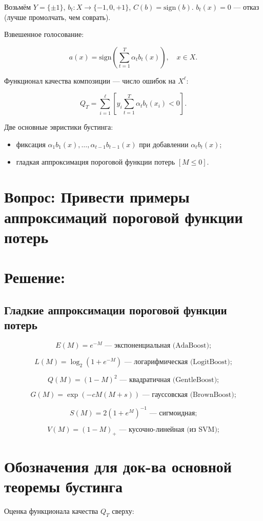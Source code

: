 Возьмём \( Y = \{\pm1\} \), \( b_t: X \rightarrow \{-1, 0, +1\} \), \( C(b) = \text{sign}(b) \).
\( b_t(x) = 0 \) — отказ (лучше промолчать, чем соврать).

Взвешенное голосование:

\[
    a(x) = \text{sign}\left(\sum_{t=1}^T \alpha_t b_t(x)\right), \quad x \in X.
\]

Функционал качества композиции — число ошибок на \( X^\ell \):

\[
    Q_T = \sum_{i=1}^\ell \left[ y_i \sum_{t=1}^T \alpha_t b_t(x_i) < 0 \right].
\]

Две основные эвристики бустинга:
\begin{itemize}
    \item фиксация \(\alpha_1 b_1(x), \ldots, \alpha_{t-1} b_{t-1}(x)\) при добавлении \(\alpha_t b_t(x)\);
    \item гладкая аппроксимация пороговой функции потерь \([M \leq 0]\).
\end{itemize}
\section*{Вопрос: Привести примеры аппроксимаций пороговой функции потерь}
\section*{Решение:}
\subsection*{Гладкие аппроксимации пороговой функции потерь}
\[
    E(M) = e^{-M} \text{ — экспоненциальная (AdaBoost);}
\]

\[
    L(M) = \log_2(1 + e^{-M}) \text{ — логарифмическая (LogitBoost);}
\]

\[
    Q(M) = (1 - M)^2 \text{ — квадратичная (GentleBoost);}
\]

\[
    G(M) = \exp\left(-cM(M + s)\right) \text{ — гауссовская (BrownBoost);}
\]

\[
    S(M) = 2(1 + e^{M})^{-1} \text{ — сигмоидная;}
\]

\[
    V(M) = (1 - M)_+ \text{ — кусочно-линейная (из SVM);}
\]

\section*{Обозначения для док-ва основной теоремы бустинга}

Оценка функционала качества \(Q_T\) сверху:

